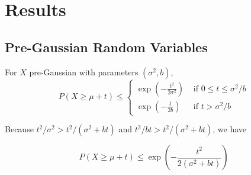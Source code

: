 

\section{Results}

\subsection{Pre-Gaussian Random Variables}
\begin{theorem} \cite*{Bartlett:2020}
  For $X$ pre-Gaussian with parameters $(\sigma^2, b)$,
  \begin{equation}
    P(X \geq \mu+t) \leq\left\{\begin{array}{ll}
    \exp \left(-\frac{t^{2}}{2 \sigma^{2}}\right) & \text { if } 0 \leq t \leq \sigma^{2} / b \\
    \exp \left(-\frac{t}{2 b}\right) & \text { if } t>\sigma^{2} / b
    \end{array}\right.
  \end{equation}
\end{theorem}

Because $t^2/ \sigma^2 > t^2/ (\sigma^2 + bt)$ and $t^2/ bt > t^2/ (\sigma^2 + bt)$, we have

\begin{equation}
  P(X \geq \mu+t) \leq 
  \exp \left(-\frac{t^{2}}{2 (\sigma^2 + bt)}\right) 
\end{equation}

